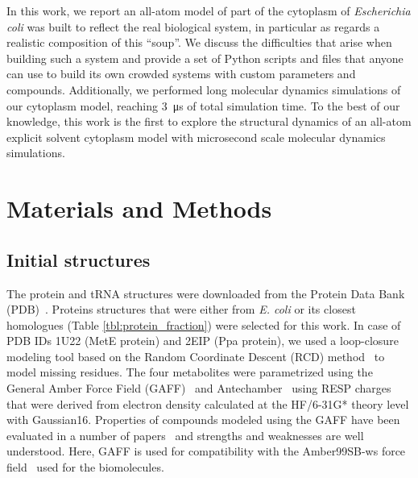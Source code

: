 \documentclass[journal=jcisd8,manuscript=article]{achemso}
\begin{document}
In this work, we report an all-atom model of part of the cytoplasm of
\textit{Escherichia coli} was built to reflect the real biological
system, in particular as regards a realistic composition of this
``soup''. We discuss the difficulties that arise when building such a
system and provide a set of Python scripts and files that anyone can
use to build its own crowded systems with custom parameters and
compounds. Additionally, we performed long molecular dynamics
simulations of our cytoplasm model, reaching \SI{3}{\micro\second} of
total simulation time. To the best of our knowledge, this work is the first to explore the
structural dynamics of an all-atom explicit solvent cytoplasm model 
with microsecond scale molecular dynamics simulations. 


\section*{Materials and Methods}

\subsection{Initial structures}
The protein and tRNA structures were downloaded from the Protein Data
Bank (PDB)~\cite{pdb}. Proteins structures that were either from {\em
  E. coli} or its closest homologues (Table
\ref{tbl:protein_fraction}) were selected for this work. In case of
PDB IDs 1U22 (MetE protein) and 2EIP (Ppa protein), we used a
loop-closure modeling tool based on the Random Coordinate Descent
(RCD) method~\cite{Chys2013} to model missing residues. The four
metabolites were parametrized using the General Amber Force Field
(GAFF)~\cite{Wang2004a} and Antechamber~\cite{Wang2005b} using RESP
charges~\cite{Bayly1993a} that were derived from electron density
calculated at the HF/6-31G* theory level with Gaussian16.  Properties
of compounds modeled using the GAFF have been evaluated in a number of
papers~\cite{Caleman2012a,sprenger2015general,Fischer2015a,JZhang2015a,Spoel2018a}
and strengths and weaknesses are well understood. Here, GAFF is used
for compatibility with the Amber99SB-ws force field~\cite{Best2014a}
used for the biomolecules.
 
 
 
\end{document}
